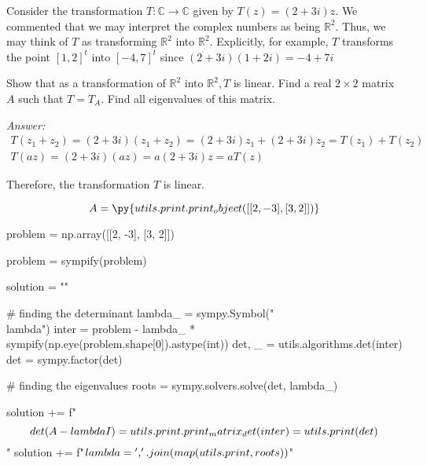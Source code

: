 \documentclass[letterpaper]{article}
\newcommand{\ans}{\textit{Answer: }}
\newenvironment{question}[2][Question]{\begin{trivlist}
\item[\hskip \labelsep {\bfseries #1}\hskip \labelsep {\bfseries #2.}]}{\end{trivlist}}
\newcommand{\printobj}[1]{\py{utils.print.print_object(#1)}}
\begin{document}
\begin{question}{5.47}
  Consider the transformation $T : \mathbb{C} \rightarrow \mathbb{C}$ given by $T(z)=(2+3 i) z .$ We
  commented that we may interpret the complex numbers as being $\mathbb{R}^{2} .$ Thus, we may
  think of $T$ as transforming $\mathbb{R}^{2}$ into $\mathbb{R}^{2} .$ Explicitly, for example, $T$ transforms
  the point $[1,2]^{t}$ into $[-4,7]^{t}$ since $(2+3 i)(1+2 i)=-4+7 i$

  Show that as a transformation of $\mathbb{R}^{2}$ into $\mathbb{R}^{2}, T$ is linear. Find a real $2 \times 2$
  matrix $A$ such that $T=T_{A} .$ Find all eigenvalues of this matrix.

  \ans 
  \begin{gather*}
    T(z_1 + z_2) = (2+3 i)(z_1 + z_2) = (2+3 i)z_1 + (2+3 i)z_2 = T(z_1) + T(z_2) \\
    T(az) = (2+3 i)(az) = a(2+3 i)z = aT(z)
  \end{gather*}

  Therefore, the transformation $T$ is linear. 

  $$A = \printobj{[[2, -3], [3, 2]]}$$

  \begin{pycode}
problem = np.array([[2, -3], [3, 2]])

problem = sympify(problem)

solution = ""

# finding the determinant 
lambda_ = sympy.Symbol("\\lambda")
inter = problem - lambda_ * sympify(np.eye(problem.shape[0]).astype(int))
det, _ = utils.algorithms.det(inter)
det = sympy.factor(det)

# finding the eigenvalues
roots = sympy.solvers.solve(det, lambda_)

solution += f"$$\\det(A - \\lambda I) = {utils.print.print_matrix_det(inter)} = {utils.print(det)}$$\n"
solution += f"$\\lambda = {', '.join(map(utils.print, roots))}$\n"
  \end{pycode}

  
  
\end{question}
\end{document}
